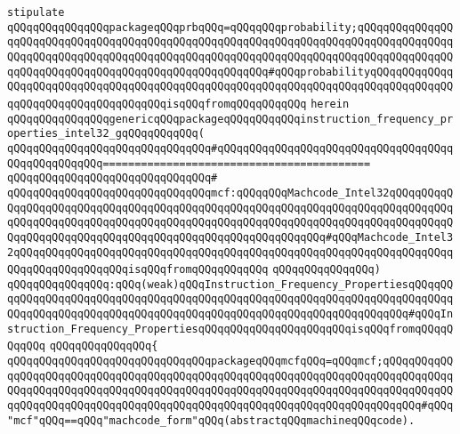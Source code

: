 \newline
\verb|stipulate|\newline
\verb|qQQqqQQqqQQqqQQqpackageqQQqprbqQQq=qQQqqQQqprobability;qQQqqQQqqQQqqQQqqQQqqQQqqQQqqQQqqQQqqQQqqQQqqQQqqQQqqQQqqQQqqQQqqQQqqQQqqQQqqQQqqQQqqQQqqQQqqQQqqQQqqQQqqQQqqQQqqQQqqQQqqQQqqQQqqQQqqQQqqQQqqQQqqQQqqQQqqQQqqQQqqQQqqQQqqQQqqQQqqQQqqQQqqQQqqQQqqQQq#qQQqprobabilityqQQqqQQqqQQqqQQqqQQqqQQqqQQqqQQqqQQqqQQqqQQqqQQqqQQqqQQqqQQqqQQqqQQqqQQqqQQqqQQqqQQqqQQqqQQqqQQqqQQqqQQqqQQqisqQQqfromqQQqqQQqqQQq|\newline
\verb|herein|\newline
\newline
\verb|qQQqqQQqqQQqqQQqgenericqQQqpackageqQQqqQQqqQQqinstruction_frequency_properties_intel32_gqQQqqQQqqQQq(|\newline
\verb|qQQqqQQqqQQqqQQqqQQqqQQqqQQqqQQq#qQQqqQQqqQQqqQQqqQQqqQQqqQQqqQQqqQQqqQQqqQQqqQQqqQQq==========================================|\newline
\verb|qQQqqQQqqQQqqQQqqQQqqQQqqQQqqQQq#|\newline
\verb|qQQqqQQqqQQqqQQqqQQqqQQqqQQqqQQqmcf:qQQqqQQqMachcode_Intel32qQQqqQQqqQQqqQQqqQQqqQQqqQQqqQQqqQQqqQQqqQQqqQQqqQQqqQQqqQQqqQQqqQQqqQQqqQQqqQQqqQQqqQQqqQQqqQQqqQQqqQQqqQQqqQQqqQQqqQQqqQQqqQQqqQQqqQQqqQQqqQQqqQQqqQQqqQQqqQQqqQQqqQQqqQQqqQQqqQQqqQQqqQQqqQQqqQQqqQQq#qQQqMachcode_Intel32qQQqqQQqqQQqqQQqqQQqqQQqqQQqqQQqqQQqqQQqqQQqqQQqqQQqqQQqqQQqqQQqqQQqqQQqqQQqqQQqqQQqqQQqisqQQqfromqQQqqQQqqQQq|\newline
\verb|qQQqqQQqqQQqqQQq)|\newline
\verb|qQQqqQQqqQQqqQQq:qQQq(weak)qQQqInstruction_Frequency_PropertiesqQQqqQQqqQQqqQQqqQQqqQQqqQQqqQQqqQQqqQQqqQQqqQQqqQQqqQQqqQQqqQQqqQQqqQQqqQQqqQQqqQQqqQQqqQQqqQQqqQQqqQQqqQQqqQQqqQQqqQQqqQQqqQQqqQQqqQQqqQQq#qQQqInstruction_Frequency_PropertiesqQQqqQQqqQQqqQQqqQQqqQQqisqQQqfromqQQqqQQqqQQq|\newline
\verb|qQQqqQQqqQQqqQQq{|\newline
\verb|qQQqqQQqqQQqqQQqqQQqqQQqqQQqqQQqpackageqQQqmcfqQQq=qQQqmcf;qQQqqQQqqQQqqQQqqQQqqQQqqQQqqQQqqQQqqQQqqQQqqQQqqQQqqQQqqQQqqQQqqQQqqQQqqQQqqQQqqQQqqQQqqQQqqQQqqQQqqQQqqQQqqQQqqQQqqQQqqQQqqQQqqQQqqQQqqQQqqQQqqQQqqQQqqQQqqQQqqQQqqQQqqQQqqQQqqQQqqQQqqQQqqQQqqQQqqQQqqQQqqQQqqQQqqQQq#qQQq"mcf"qQQq==qQQq"machcode_form"qQQq(abstractqQQqmachineqQQqcode).|\newline
